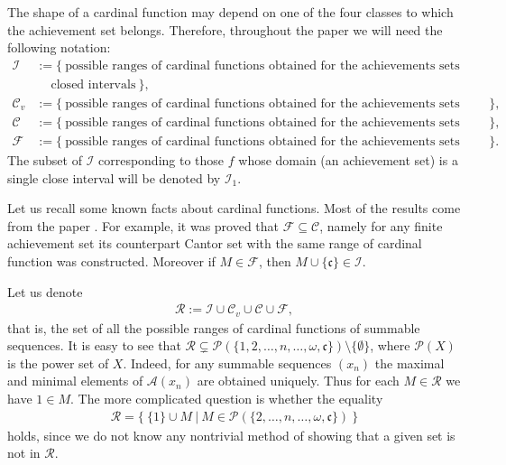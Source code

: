 \documentclass{amsart}
\theoremstyle{definition}
\newcommand{\Cv}{\mathcal{C}_{v}}
\begin{document}
The shape of a cardinal function may depend on one of the four classes to which the achievement set belongs. Therefore, throughout the paper we will need the following notation:
\begin{align*}
\mathcal{I} & := \big\{\ \textrm{possible ranges of cardinal functions obtained for the achievements sets being unions of } \\
& \ \ \ \ \textrm{ closed intervals}\ \big\}, \\
\Cv & := \big\{\ \textrm{possible ranges of cardinal functions obtained for the achievements sets being cantorvals}\ \big\}, \\
\mathcal{C} & := \big\{\ \textrm{possible ranges of cardinal functions obtained for the achievements sets being Cantor sets}\ \big\}, \\
\mathcal{F} & := \big\{\ \textrm{possible ranges of cardinal functions obtained for the achievements sets being finite sets}\ \big\}.
\end{align*}
The subset of $\mathcal{I}$ corresponding to those $f$ whose domain (an achievement set) is a single close interval will be denoted by $\mathcal{I}_{1}$.
 

Let us recall some known facts about cardinal functions. Most of the results come from the paper \cite{cardfun}. For example, it was proved that $\mathcal{F}\subseteq \mathcal{C}$, namely for any finite achievement set its counterpart Cantor set with the same range of cardinal function was constructed. Moreover if $M\in \mathcal{F}$, then $M\cup\{\mathfrak{c}\}\in \mathcal{I}$. 

Let us denote
\begin{align*}
\mathcal{R}:=\mathcal{I}\cup \Cv\cup \mathcal{C} \cup \mathcal{F},
\end{align*}
that is, the set of all the possible ranges of cardinal functions of summable sequences. It is easy to see that $\mathcal{R}\subsetneq \mathcal{P}(\{1,2,\ldots,n,\ldots,\omega,\mathfrak{c}\})\setminus\{\emptyset\}$, where $\mathcal{P}(X)$ is the power set of $X$. Indeed, for any summable sequences $(x_n)$ the maximal and minimal elements of $\mathcal{A}(x_n)$ are obtained uniquely. Thus for each $M\in \mathcal{R}$ we have $1\in M$.
The more complicated question is whether the equality
\begin{align*}
\mathcal{R}=\big\{\ \{1\}\cup M\ \big|\ M\in\mathcal{P}(\{2,\ldots,n,\ldots,\omega,\mathfrak{c}\}) \ \big\}
\end{align*}
holds, since we do not know any nontrivial method of showing that a given set is not in $\mathcal{R}$.
\end{document}
